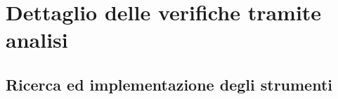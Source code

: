 %


\section{Dettaglio delle verifiche tramite analisi}
	\label{sub:dettaglio_delle_verifiche_tramite_analisi}
	\subsection{Ricerca ed implementazione degli strumenti}
	\label{sub:ricerca_ed_implementazione_degli_strumenti}
